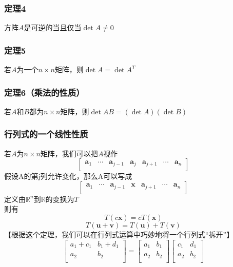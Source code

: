 \documentclass{article}
\newcommand{\ve}{\boldsymbol}
\begin{document}
\begin{CJK}{UTF8}{gkai}
\subsubsection{定理4}
方阵$A$是可逆的当且仅当$\det A\neq 0$\\
\subsubsection{定理5}
若$A$为一个$n\times n$矩阵，则$\det A=\det A^{T}$\\
\subsubsection{定理6（乘法的性质）}
若$A$和$B$都为$n\times n$矩阵，则$\det AB=(\det A)(\det B)$\\
\subsubsection{行列式的一个线性性质}
若$A$为$n\times n$矩阵，我们可以把$A$视作
\[\begin{bmatrix}
    \ve{a}_1&\cdots&\ve{a}_{j-1}&\ve{a}_j&\ve{a}_{j+1}&\cdots&\ve{a}_n\\
\end{bmatrix}\]
假设A的第j列允许变化，那么A可以写成
\[\begin{bmatrix}
    \ve{a}_1&\cdots&\ve{a}_{j-1}&\ve{x}&\ve{a}_{j+1}&\cdots&\ve{a}_n\\
\end{bmatrix}\]
定义由$\mathbb{R}^n$到$\mathbb{R}$的变换为$T$\\
则有\\
\[T(c\ve{x})=cT(\ve{x})\]
\[T(\ve{u}+\ve{v})=T(\ve{u})+T(\ve{v})\]
【根据这个定理，我们可以在行列式运算中巧妙地将一个行列式“拆开”】\\
\[\begin{bmatrix}
    a_1+c_1&b_1+d_1\\
    a_2&b_2\\
\end{bmatrix}
=
\begin{bmatrix}
    a_1&b_1\\
    a_2&b_2\\
\end{bmatrix}
\begin{bmatrix}
    c_1&d_1\\
    a_2&b_2\\
\end{bmatrix}\]

\end{CJK}
\end{document}
